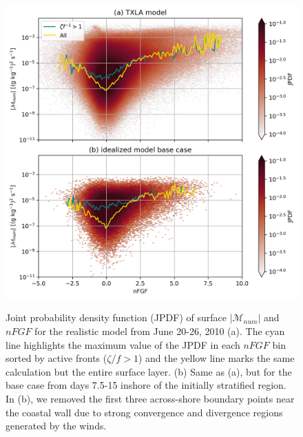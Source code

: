 \begin{figure}[t!]
    \begin{center}
    \includegraphics[width = 0.9\linewidth]{figures/shelfstrat_2024/txla_shelfstrat_jpdf.jpg}\\
    \caption{Joint probability density function (JPDF) of surface $|\mathcal{M}_{num}|$ and $nFGF$  for the realistic model from June 20-26, 2010 (a). The cyan line highlights the maximum value of the JPDF in each $nFGF$ bin sorted by active fronts ($\zeta/f>1$)  and the yellow line marks the same calculation but the entire surface layer. (b) Same as (a), but for the base case from days 7.5-15 inshore of the initially stratified region.  In (b), we removed the first three across-shore boundary points near the coastal wall due to strong convergence and divergence regions generated by the winds.}\label{fig:jpdf}
     \end{center}
\end{figure}

